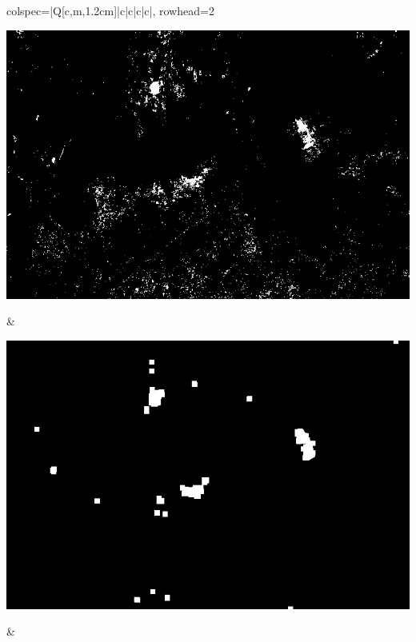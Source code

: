 \begin{longtblr}[
            caption = {Hasil uji coba proses \textit{background subtraction} menggunakan GMM yang disempurnakan oleh Operasi Morfologi},
            label = {tab:gmm_morph_9908}
        ]{
            colspec={|Q[c,m,1.2cm]|c|c|c|c|},
            rowhead=2
        }
\begin{minipage}{0.19\textwidth}
                \includegraphics[width=\linewidth]{image/9866/9866_gmm_frame789.jpg}
            \end{minipage} & 
            \begin{minipage}{0.19\textwidth}
                \includegraphics[width=\linewidth]{image/9866/9866_dilated_3x9_frame789.jpg}
            \end{minipage} &
            \begin{minipage}{0.19\textwidth}

\end{minipage}
\end{longtblr}
